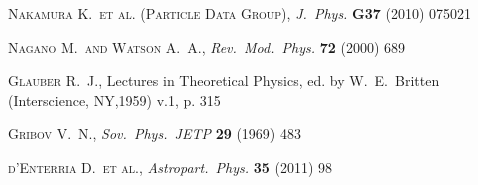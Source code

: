 \documentclass[TOTEM]{cern/cernphprep}
\def\etal{et al.}
\def\Name#1{\textsc{#1}, }
\def\REVIEW#1#2#3#4{{\it #1} {\bf #2} (#3) #4}
\begin{document}
\begin{thebibliography}{00}
	\Name{Nakamura K.~\etal{} (Particle Data Group)}
	\REVIEW{J.~Phys.}{G37}{2010}{075021}

	\Name{Nagano M.~and Watson A.~A.}
	\REVIEW{Rev.~Mod.~Phys.}{72}{2000}{689}

	\Name{Glauber R.~J.}
	Lectures in Theoretical Physics, ed. by W.~E.~Britten (Interscience, NY,1959) v.1, p. 315

	\Name{Gribov V.~N.}
	\REVIEW{Sov.~Phys.~JETP}{29}{1969}{483}

	\Name{d'Enterria D.~\etal}
	\REVIEW{Astropart.~Phys.}{35}{2011}{98}

\end{thebibliography}
\end{document}
